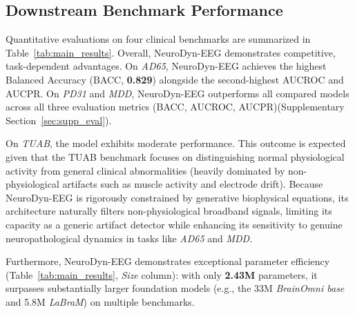 \documentclass{article}
\begin{document}
{\subsection{Downstream Benchmark Performance}
\label{sec:downstream_eval}
Quantitative evaluations on four clinical benchmarks are summarized in Table~\ref{tab:main_results}. Overall, NeuroDyn-EEG demonstrates competitive, task-dependent advantages. On \textit{AD65}, NeuroDyn-EEG achieves the highest Balanced Accuracy (BACC, \textbf{0.829}) alongside the second-highest AUCROC and AUCPR. On \textit{PD31} and \textit{MDD}, NeuroDyn-EEG outperforms all compared models across all three evaluation metrics (BACC, AUCROC, AUCPR)(Supplementary Section~\ref{sec:supp_eval}).

On \textit{TUAB}, the model exhibits moderate performance. This outcome is expected given that the TUAB benchmark focuses on distinguishing normal physiological activity from general clinical abnormalities (heavily dominated by non-physiological artifacts such as muscle activity and electrode drift). Because NeuroDyn-EEG is rigorously constrained by generative biophysical equations, its architecture naturally filters non-physiological broadband signals, limiting its capacity as a generic artifact detector while enhancing its sensitivity to genuine neuropathological dynamics in tasks like \textit{AD65} and \textit{MDD}.

Furthermore, NeuroDyn-EEG demonstrates exceptional parameter efficiency (Table~\ref{tab:main_results}, \textit{Size} column): with only \textbf{2.43M} parameters, it surpasses substantially larger foundation models (e.g., the 33M \textit{BrainOmni base} and 5.8M \textit{LaBraM}) on multiple benchmarks.

}
\end{document}
